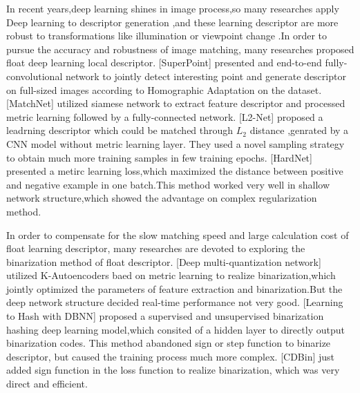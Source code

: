 \documentclass{svproc}
\begin{document}
In recent years,deep learning shines in image process,so many researches apply Deep learning to descriptor generation ,and these learning descriptor are more robust to transformations like illumination or viewpoint change .In order to pursue the accuracy and robustness of image matching, many researches proposed float deep learning local descriptor.
[SuperPoint] presented and end-to-end fully-convolutional network to jointly detect interesting point and  generate descriptor on full-sized images according to Homographic Adaptation on the dataset.
[MatchNet] utilized  siamese network to extract feature descriptor and processed metric learning followed by a fully-connected network.
[L2-Net] proposed a leadrning descriptor which could be matched through $L_{2}$ distance ,genrated by a CNN model without metric learning layer. They used a novel sampling strategy to obtain much more training samples in few training epochs.
[HardNet] presented a metirc learning loss,which maximized the distance between positive and negative example in one batch.This method worked very well in shallow network structure,which showed the advantage on complex regularization method.

In order to compensate for the slow matching speed and large calculation cost of float learning descriptor, many researches are devoted to exploring the binarization method of float descriptor.
[Deep  multi-quantization network] utilized K-Autoencoders baed on metric learning to realize binarization,which jointly optimized the parameters of feature extraction and  binarization.But the deep network structure  decided  real-time performance not very good. 
[Learning to Hash  with DBNN] proposed a supervised and unsupervised binarization hashing deep learning model,which consited of a hidden layer to directly output binarization codes. This method abandoned sign or step function to binarize descriptor, but caused the training process much more complex. 
[CDBin] just added sign function in the loss function to realize binarization, which was very direct and efficient.
\end{document}
